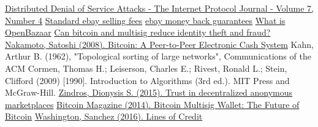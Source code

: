 \documentclass[11pt]{llncs}
\begin{document}
  \begin{thebibliography}{20}
     \href{http://www.cisco.com/c/en/us/about/press/internet-protocol-journal/back-issues/table-contents-30/dos-attacks.html}
           {Distributed Denial of Service Attacks - The Internet Protocol Journal - Volume 7, Number 4}
     \href{http://pages.ebay.com/help/sell/fees.html}{Standard ebay selling fees}
     \href{http://pages.ebay.com/ebay-money-back-guarantee/questions.html}{ebay money back guarantees}
     \href{https://blog.openbazaar.org/what-is-openbazaar/}{What is OpenBazaar}
     \href{https://blog.openbazaar.org/can-bitcoin-and-multisig-reduce-identity-theft-and-fraud/}{Can bitcoin and multisig
     reduce identity theft and fraud?}
     \href{https://bitcoin.org/bitcoin.pdf}{Nakamoto, Satoshi (2008). Bitcoin: A Peer-to-Peer Electronic Cash System}
     Kahn, Arthur B. (1962), "Topological sorting of large networks", Communications of the ACM
     Cormen, Thomas H.; Leiserson, Charles E.; Rivest, Ronald L.; Stein, Clifford (2009) [1990]. Introduction to Algorithms
     (3rd ed.). MIT Press and McGraw-Hill.
     \href{https://dionyziz.com/pseudonymous-trust-2.pdf}{Zindros, Dionysis S. (2015). Trust in decentralized anonymous
     marketplaces}
     \href{https://bitcoinmagazine.com/articles/multisig-future-bitcoin-1394686504}{Bitcoin Magazine (2014). Bitcoin Multisig
     Wallet: The Future of Bitcoin}
     \href{https://gist.github.com/drwasho/2c40b91e169f55988618#part-3-web-of-credit}{Washington, Sanchez (2016). Lines of
     Credit}
  \end{thebibliography}
\end{document}
